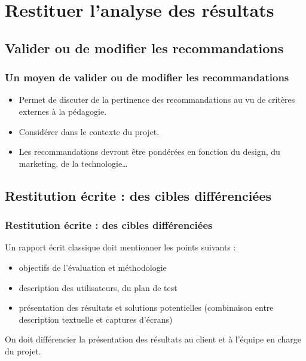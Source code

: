 \section{Restituer l'analyse des résultats} 	
\subsection{Valider ou de modifier les recommandations} 
		\begin{frame}[allowframebreaks]
		\frametitle{Un moyen de valider ou de modifier les recommandations}
			\begin {itemize}
				      \item Permet de discuter de la pertinence des recommandations au vu de critères externes à la pédagogie.
				      \item Considérer dans le contexte du projet. 
				      \item Les recommandations devront être pondérées en fonction du design, du marketing, de la technologie… 
				      		
				\end{itemize}
		\end{frame}   
		
	
\subsection{Restitution écrite : des cibles différenciées} 
		\begin{frame}[allowframebreaks]
		\frametitle{Restitution écrite : des cibles différenciées}
			Un rapport écrit classique doit mentionner les points suivants :
			\begin {itemize}
				      \item objectifs de l'évaluation et méthodologie
				      \item description des utilisateurs, du plan de test
				      \item présentation des résultats et solutions potentielles (combinaison entre description textuelle et captures d'écrans)


				      		
				\end{itemize}
				On doit différencier la présentation des résultats au client et à l'équipe en charge du projet. 
		\end{frame}    	
	 	
